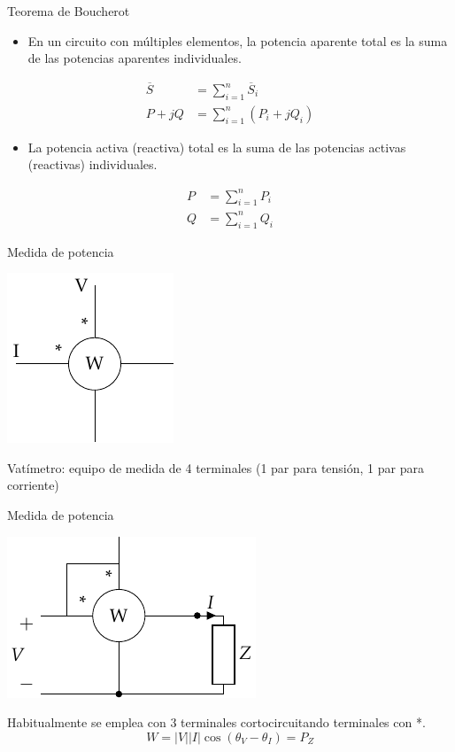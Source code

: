 \documentclass[aspectratio=169, usenames,svgnames,dvipsnames]{beamer}
\begin{document}
\begin{frame}[label={sec:org8c97ab6}]{Teorema de Boucherot}
\begin{itemize}
\item En un circuito con múltiples elementos, la potencia aparente total es la suma de las potencias aparentes individuales.
\end{itemize}
\begin{align*}
  \overline{S} &= \sum_{i = 1}^{n} \overline{S}_i\\
  P + jQ &= \sum^n_{i = 1} (P_i + jQ_i)
\end{align*}

\begin{itemize}
\item La potencia activa (reactiva) total es la suma de las potencias activas (reactivas) individuales.
\end{itemize}

\begin{align*}
P &= \sum_{i = 1}^n P_i\\
Q &= \sum_{i = 1}^n Q_i
\end{align*}
\end{frame}

\begin{frame}[label={sec:org139e09e}]{Medida de potencia}
\begin{center}
\includegraphics[height=0.7\textheight]{../figs/vatimetro.pdf}
\end{center}

\alert{Vatímetro}: equipo de medida de 4 terminales (1 par para tensión, 1 par para corriente)
\end{frame}

\begin{frame}[label={sec:orgba48fc5}]{Medida de potencia}
\begin{center}
\includegraphics[height=0.5\textheight]{../figs/vatimetro_Z.pdf}
\end{center}


Habitualmente se emplea con 3 terminales cortocircuitando terminales con *.
\[
  \boxed{W = |V| |I| \cos(\theta_V - \theta_I) = P_Z}
\]
\end{frame}
\end{document}
